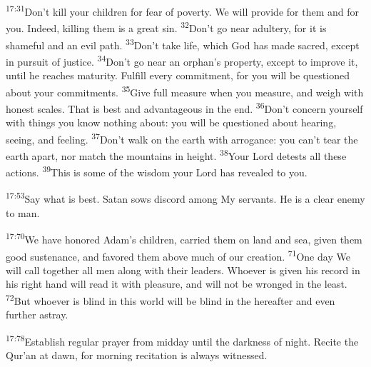 \documentclass[openany,12pt,english]{book}
\newenvironment{para}{\par\pretolerance=100\tolerance=200\setlength{\emergencystretch}{0.6em}\relax}{\par}
\begin{document}
\begin{para}
    \textsuperscript{17:31}\thinspace{}Don't kill your chil\-dren for fear of pov\-er\-ty. We will pro\-vide for them and for you. In\-deed, kill\-ing them is a great sin.
    \textsuperscript{32}\thinspace{}Don't go near a\-dul\-ter\-y, for it is shame\-ful and an evil path.
    \textsuperscript{33}\thinspace{}Don't take life, which God has made sa\-cred, ex\-cept in pur\-suit of jus\-tice.
    \textsuperscript{34}\thinspace{}Don't go near an orphan's prop\-er\-ty, ex\-cept to im\-prove it, un\-til he reaches ma\-tur\-i\-ty. Ful\-fill eve\-ry com\-mit\-ment, for you will be questioned a\-bout your commitments.
    \textsuperscript{35}\thinspace{}Give full meas\-ure when you meas\-ure, and weigh with hon\-est scales. That is best and ad\-van\-ta\-geous in the end.
    \textsuperscript{36}\thinspace{}Don't con\-cern your\-self with things you know noth\-ing a\-bout: you will be questioned a\-bout hear\-ing, see\-ing, and feel\-ing.
    \textsuperscript{37}\thinspace{}Don't walk on the earth with ar\-ro\-gance: you can't tear the earth a\-part, nor match the mountains in height.
    \textsuperscript{38}\thinspace{}Your Lord detests all these actions.
    \textsuperscript{39}\thinspace{}This is some of the wis\-dom your Lord has revealed to you.
\end{para}

\begin{para}
    \textsuperscript{17:53}\thinspace{}Say what is best. Satan sows dis\-cord a\-mong My servants. He is a clear en\-e\-my to man.
\end{para}

\begin{para}
    \textsuperscript{17:70}\thinspace{}We have honored Adam's chil\-dren, car\-ried them on land and sea, giv\-en them good sus\-te\-nance, and fa\-vored them a\-bove much of our cre\-a\-tion.
    \textsuperscript{71}\thinspace{}One day We will call to\-geth\-er all men a\-long with their leaders. Who\-ev\-er is giv\-en his rec\-ord in his right hand will read it with pleas\-ure, and will not be wronged in the least.
    \textsuperscript{72}\thinspace{}But who\-ev\-er is blind in this world will be blind in the here\-af\-ter and e\-ven fur\-ther a\-stray.
\end{para}

\begin{para}
    \textsuperscript{17:78}\thinspace{}Es\-tab\-lish reg\-u\-lar pray\-er from mid\-day un\-til the dark\-ness of night. Re\-cite the Qur'an at dawn, for morn\-ing rec\-i\-ta\-tion is al\-ways witnessed.
\end{para}
\end{document}
